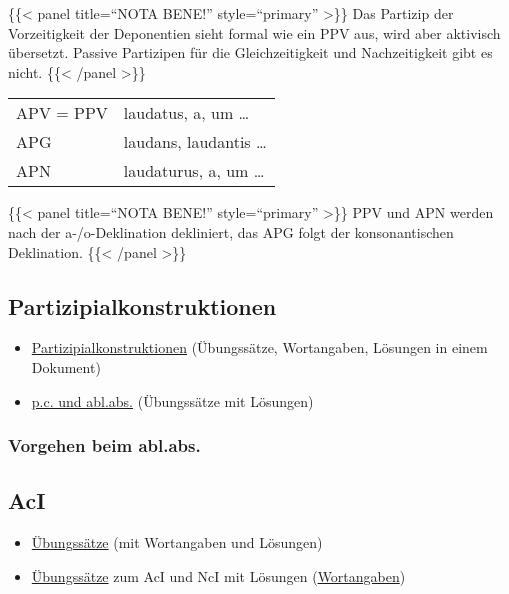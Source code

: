 \documentclass{scrartcl}
\begin{document}
\{\{< panel title="`NOTA BENE!"' style="`primary"' >\}\} Das Partizip der Vorzeitigkeit der Deponentien sieht formal wie ein PPV aus, wird aber aktivisch übersetzt. Passive Partizipen für die Gleichzeitigkeit und Nachzeitigkeit gibt es nicht. \{\{< /panel >\}\}

\begin{center}
\begin{tabular}{ll}
APV = PPV & laudatus, a, um \ldots{}\\
APG & laudans, laudantis \ldots{}\\
APN & laudaturus, a, um \ldots{}\\
\end{tabular}
\end{center}


\{\{< panel title="`NOTA BENE!"' style="`primary"' >\}\} PPV und APN werden nach der a-/o-Deklination dekliniert, das APG folgt der konsonantischen Deklination. \{\{< /panel >\}\}

\subsection{Partizipialkonstruktionen}
\label{sec:org842b4c7}

\begin{itemize}
\item \href{https://www.dropbox.com/s/7hgaz2130uzlw0d/\%25C2\%25A746Partizipialkonstruktionen.pdf?dl=0}{Partizipialkonstruktionen} (Übungssätze, Wortangaben, Lösungen in
einem Dokument)
\item \href{https://www.dropbox.com/s/9uwdu2l7g1kr8gi/PC\_ablabs2.pdf?dl=0}{p.c. und abl.abs.} (Übungssätze mit Lösungen)
\end{itemize}

\subsubsection{Vorgehen beim abl.abs.}
\label{sec:orgd64785f}

\subsection{AcI}
\label{sec:org4b44cce}

\begin{itemize}
\item \href{https://www.dropbox.com/s/p3vtu5snnd3z27r/AcI.pdf?dl=0}{Übungssätze} (mit Wortangaben und Lösungen)
\item \href{https://www.dropbox.com/s/4vx8vgcisfx9wll/AcI\_NcI.pdf?dl=0}{Übungssätze} zum AcI und NcI mit Lösungen (\href{https://www.dropbox.com/s/ef0rmrd1262svd3/Wortangaben\_AcI\_NcI.pdf?dl=0}{Wortangaben})
\end{itemize}
\end{document}
